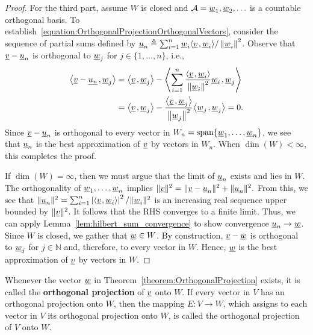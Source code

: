 \begin{proof}
For the third part, assume $W$ is closed and $\mathcal{A} = \underline{w}_1,\underline{w}_2, \ldots$ is a countable orthogonal basis.
To establish~\eqref{equation:OrthogonalProjectionOrthogonalVectors}, consider the sequence of partial sums defined by $\underline{u}_n \triangleq \sum_{i=1}^n \underline{w}_i {\left\langle  \underline{v}  \mskip2mu ,  \underline{w}_i  \right\rangle} / \left\| \underline{w}_i \right\|^2$.
Observe that $\underline{v} -\underline{u}_n$ is orthogonal to $\underline{w}_j$ for $j \in \{1,\ldots,n\}$, i.e.,
\begin{equation*}
\begin{split}
{\left\langle  \underline{v} - \underline{u_n}  \mskip2mu ,  \underline{w}_j  \right\rangle}
&= {\left\langle  \underline{v}  \mskip2mu ,  \underline{w}_j  \right\rangle}
- {\left\langle  \sum_{i=1}^n \frac{ {\left\langle  \underline{v}  \mskip2mu ,  \underline{w}_i  \right\rangle} }{ \left\| \underline{w}_i \right\|^2 } \underline{w}_i  \mskip2mu ,  \underline{w}_j  \right\rangle} \\
&= {\left\langle  \underline{v}  \mskip2mu ,  \underline{w}_j  \right\rangle}
- \frac{ {\left\langle  \underline{v}  \mskip2mu ,  \underline{w}_j  \right\rangle} }{ \left\| \underline{w}_j \right\|^2 } {\left\langle  \underline{w}_j  \mskip2mu ,  \underline{w}_j  \right\rangle}
= 0.
\end{split}
\end{equation*}
Since $\underline{v} - \underline{u}_n$ is orthogonal to every vector in $W_n = \mathrm{span} \{\underline{w}_1,\ldots,\underline{w}_n\}$, we see that $\underline{u}_n$ is the best approximation of $\underline{v}$ by vectors in $W_n$.
When $\dim(W) < \infty$, this completes the proof.

If $\dim(W) = \infty$, then we must argue that the limit of $\underline{u}_n$ exists and lies in $W$.
The orthogonality of $\underline{w}_1,\ldots,\underline{w}_n$ implies $\|\underline{v}\|^2 = \| \underline{v} - \underline{u}_n \|^2 + \|\underline{u}_n\|^2.$
From this, we see that $\| \underline{u}_n \|^2 = \sum_{i=1}^n \left|{\langle  \underline{v}  \mskip1mu ,  \underline{w}_i  \rangle} \right|^2 / \|\underline{w}_i\|^2$ is an increasing real sequence upper bounded by $\|\underline{v}\|^2$.
It follows that the RHS converges to a finite limit.
Thus, we can apply Lemma~\ref{lem:hilbert_sum_convergence} to show convergence $\underline{u}_n \to \underline{w}$.
Since $W$ is closed, we gather that $\underline{w} \in W$.
By construction, $\underline{v} -\underline{w}$ is orthogonal to $\underline{w}_j$ for $j \in \mathbb{N}$ and, therefore, to every vector in $W$.
Hence, $\underline{w}$ is the best approximation of $\underline{v}$ by vectors in $W$.
\end{proof}

\begin{definition}
Whenever the vector $\underline{w}$ in Theorem~\ref{theorem:OrthogonalProjection} exists, it is called the \textbf{orthogonal projection} of $\underline{v}$ onto $W$.
If every vector in $V$ has an orthogonal projection onto $W$, then the mapping $E \colon V \rightarrow W$, which assigns to each vector in $V$ its orthogonal projection onto $W$, is called the orthogonal projection of $V$ onto $W$.
\end{definition}

